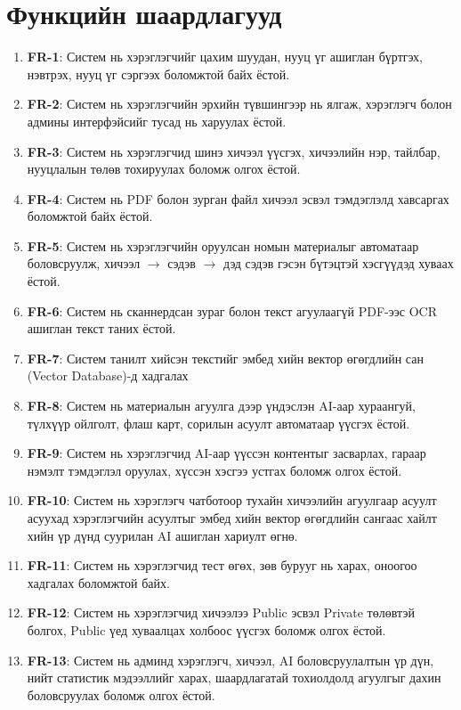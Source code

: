 \section{Функцийн шаардлагууд}

\begin{enumerate}
    \item \textbf{FR-1}: Систем нь хэрэглэгчийг цахим шуудан, нууц үг ашиглан бүртгэх, нэвтрэх, нууц үг сэргээх боломжтой байх ёстой.
    \item \textbf{FR-2}: Систем нь хэрэглэгчийн эрхийн түвшингээр нь ялгаж, хэрэглэгч болон админы интерфэйсийг тусад нь харуулах ёстой.
    \item \textbf{FR-3}: Систем нь хэрэглэгчид шинэ хичээл үүсгэх, хичээлийн нэр, тайлбар, нууцлалын төлөв тохируулах боломж олгох ёстой.
    \item \textbf{FR-4}: Систем нь PDF болон зурган файл хичээл эсвэл тэмдэглэлд хавсаргах боломжтой байх ёстой.
    \item \textbf{FR-5}: Систем нь хэрэглэгчийн оруулсан номын материалыг автоматаар боловсруулж, хичээл $\rightarrow$ сэдэв $\rightarrow$ дэд сэдэв гэсэн бүтэцтэй хэсгүүдэд хуваах ёстой.
    \item \textbf{FR-6}: Систем нь сканнердсан зураг болон текст агуулаагүй PDF-ээс OCR ашиглан текст таних ёстой.
    \item \textbf{FR-7}: Систем танилт хийсэн текстийг эмбед хийн вектор өгөгдлийн сан (Vector Database)-д хадгалах
    \item \textbf{FR-8}: Систем нь материалын агуулга дээр үндэслэн AI-аар хураангуй, түлхүүр ойлголт, флаш карт, сорилын асуулт автоматаар үүсгэх ёстой.
    \item \textbf{FR-9}: Систем нь хэрэглэгчид AI-аар үүссэн контентыг засварлах, гараар нэмэлт тэмдэглэл оруулах, хүссэн хэсгээ устгах боломж олгох ёстой.
    \item \textbf{FR-10}: Систем нь хэрэглэгч чатботоор тухайн хичээлийн агуулгаар асуулт асуухад хэрэглэгчийн асуултыг эмбед хийн вектор өгөгдлийн сангаас хайлт хийн үр дүнд суурилан AI ашиглан хариулт өгнө.
    \item \textbf{FR-11}: Систем нь хэрэглэгчид тест өгөх, зөв бурууг нь харах, оноогоо хадгалах боломжтой байх.
    \item \textbf{FR-12}: Систем нь хэрэглэгчид хичээлээ Public эсвэл Private төлөвтэй болгох, Public үед хуваалцах холбоос үүсгэх боломж олгох ёстой.
    \item \textbf{FR-13}: Систем нь админд хэрэглэгч, хичээл, AI боловсруулалтын үр дүн, нийт статистик мэдээллийг харах, шаардлагатай тохиолдолд агуулгыг дахин боловсруулах боломж олгох ёстой.
\end{enumerate}

